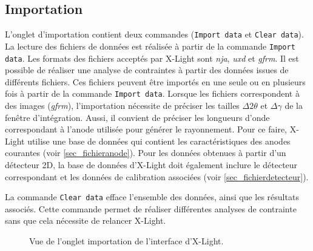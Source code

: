 \documentclass[french,a4paper]{report}
\begin{document}
\subsection{Importation}

L'onglet d'importation contient deux commandes (\texttt{Import data} et \texttt{Clear data}). La lecture des fichiers de données est réalisée à partir de la commande \texttt{Import data}. Les formats des fichiers acceptés par X-Light sont \textit{nja}, \textit{uxd} et \textit{gfrm}. Il est possible de réaliser une analyse de contraintes à partir des données issues de différents fichiers. Ces fichiers peuvent être importés en une seule ou en plusieurs fois à partir de la commande \texttt{Import data}. Lorsque les fichiers correspondent à des images (\textit{gfrm}), l'importation nécessite de préciser les tailles $\Delta 2 \theta$ et $\Delta \gamma$ de la fenêtre d'intégration. Aussi, il convient de préciser les longueurs d'onde correspondant à l'anode utilisée pour générer le rayonnement. Pour ce faire, X-Light utilise une base de données qui contient les caractéristiques des anodes courantes (voir \ref{sec_fichieranode}). Pour les données obtenues à partir d'un détecteur 2D, la base de données d'X-Light doit également inclure le détecteur correspondant et les données de calibration associées (voir \ref{sec_fichierdetecteur}).

La commande \texttt{Clear data} efface l'ensemble des données, ainsi que les résultats associés. Cette commande permet de réaliser différentes analyses de contrainte sans que cela nécessite de relancer X-Light.


\begin{figure}[h!]
\centering
{}
\caption{Vue de l'onglet importation de l'interface d'X-Light.}
\label{fig_import}
\end{figure}
\end{document}
